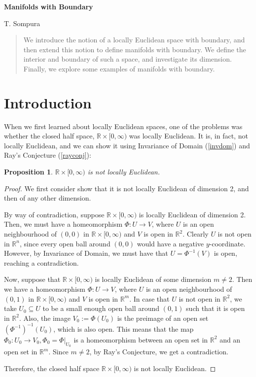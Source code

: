 \documentclass{article}
\newcommand{\R}{\mathbb{R}}
\theoremstyle{plain} %
\numberwithin{thm}{section} %
\newtheorem{prop}[thm]{Proposition}
\theoremstyle{definition} %
\begin{document}
\begin{center}
    {\Large \textbf{Manifolds with Boundary}}

    \medskip
    {\large T. Sompura}
\end{center}

\begin{abstract}
    We introduce the notion of a locally Euclidean space with boundary, and then extend this notion to define manifolds with boundary. We define the interior and boundary of such a space, and investigate its dimension. Finally, we explore some examples of manifolds with boundary.
\end{abstract}

\section{Introduction}

When we first learned about locally Euclidean spaces, one of the problems was whether the closed half space, $\R \times [0, \infty)$ was locally Euclidean. It is, in fact, not locally Euclidean, and we can show it using Invariance of Domain (\ref{invdom}) and Ray's Conjecture (\ref{rayconj}):

\begin{prop}
    $\R \times [0, \infty)$ is not locally Euclidean.
\end{prop}
\begin{proof}
We first consider show that it is not locally Euclidean of dimension 2, and then of any other dimension.

By way of contradiction, suppose $\R \times [0, \infty)$ is locally Euclidean of dimension 2. Then, we must have a homeomorphism $\Phi: U \to V$, where $U$ is an open neighbourhood of $(0, 0)$ in $\R \times [0, \infty)$ and $V$ is open in $\R^2$. Clearly $U$ is not open in $\R^n$, since every open ball around $(0, 0)$ would have a negative $y$-coordinate. However, by Invariance of Domain, we must have that $U = \Phi^{-1}(V)$ is open, reaching a contradiction.

Now, suppose that $\R \times [0, \infty)$ is locally Euclidean of some dimension $m \neq 2$. Then we have a homeomorphism $\Phi: U \to V$, where $U$ is an open neighbourhood of $(0, 1)$ in $\R \times [0, \infty)$ and $V$ is open in $\R^m$. In case that $U$ is not open in $\R^2$, we take $U_0 \subseteq U$ to be a small enough open ball around $(0, 1)$ such that it is open in $\R^2$. Also, the image $V_0 := \Phi(U_0)$ is the preimage of an open set $(\Phi^{-1})^{-1}(U_0)$, which is also open. This means that the map $\Phi_0: U_0 \to V_0, \Phi_0 = \Phi|_{U_0}$ is a homeomorphism between an open set in $\R^2$ and an open set in $\R^m$. Since $m \neq 2$, by Ray's Conjecture, we get a contradiction.

Therefore, the closed half space $\R \times [0, \infty)$ is not locally Euclidean.
\end{proof}
\end{document}

